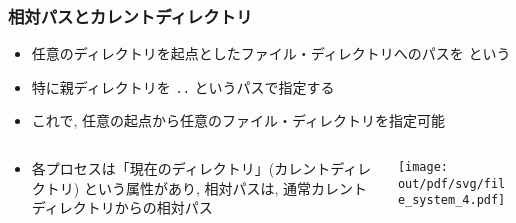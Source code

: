 \documentclass[12pt,dvipdfmx]{beamer}
\begin{document}
\begin{frame}
  \frametitle{相対パスとカレントディレクトリ}
  \begin{itemize}
  \item 任意のディレクトリを起点としたファイル・ディレクトリへのパスを
    という
  \item 特に親ディレクトリを {\tt ..} というパスで指定する
  \item これで, 任意の起点から任意のファイル・ディレクトリを指定可能
  \end{itemize}
  \begin{columns}
    \begin{column}{0.60\textwidth}
      \begin{itemize}
      \item 各プロセスは「現在のディレクトリ」(カレントディレクトリ)
        という属性があり, 相対パスは, 通常カレントディレクトリからの相対パス
      \end{itemize}
    \end{column}
    \begin{column}{0.40\textwidth}
      \begin{center}
        \texttt{[image: out/pdf/svg/file\_system\_4.pdf]}
      \end{center}
    \end{column}
  \end{columns}
\end{frame}
\end{document}
